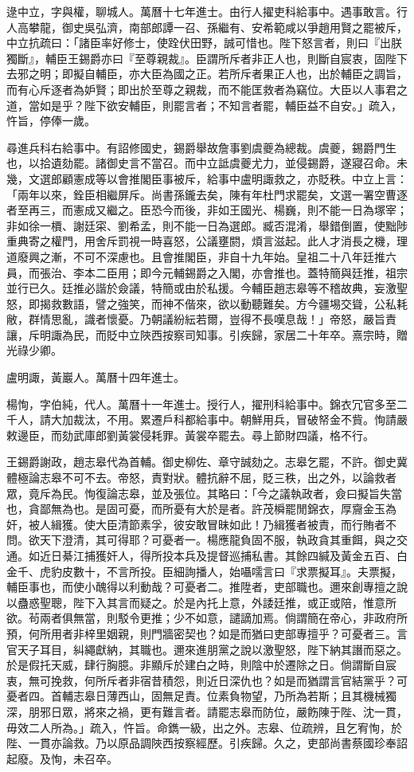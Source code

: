 \begin{pinyinscope}
逯中立，字與權，聊城人。萬曆十七年進士。由行人擢吏科給事中。遇事敢言。行人高攀龍，御史吳弘濟，南部郎譚一召、孫繼有、安希範咸以爭趙用賢之罷被斥，中立抗疏曰：「諸臣率好修士，使跧伏田野，誠可惜也。陛下怒言者，則曰『出朕獨斷』，輔臣王錫爵亦曰『至尊親裁』。臣謂所斥者非正人也，則斷自宸衷，固陛下去邪之明；即擬自輔臣，亦大臣為國之正。若所斥者果正人也，出於輔臣之調旨，而有心斥逐者為妒賢；即出於至尊之親裁，而不能匡救者為竊位。大臣以人事君之道，當如是乎？陛下欲安輔臣，則罷言者；不知言者罷，輔臣益不自安。」疏入，忤旨，停俸一歲。

尋進兵科右給事中。有詔修國史，錫爵舉故詹事劉虞夔為總裁。虞夔，錫爵門生也，以拾遺劾罷。諸御史言不當召。而中立詆虞夔尤力，並侵錫爵，遂寢召命。未幾，文選郎顧憲成等以會推閣臣事被斥，給事中盧明諏救之，亦貶秩。中立上言：「兩年以來，銓臣相繼屏斥。尚書孫鑨去矣，陳有年杜門求罷矣，文選一署空曹逐者至再三，而憲成又繼之。臣恐今而後，非如王國光、楊巍，則不能一日為塚宰；非如徐一檟、謝廷寀、劉希孟，則不能一日為選郎。臧否混淆，舉錯倒置，使黜陟重典寄之權門，用舍斥罰視一時喜怒，公議壅閼，煩言滋起。此人才消長之機，理道廢興之漸，不可不深慮也。且會推閣臣，非自十九年始。皇祖二十八年廷推六員，而張治、李本二臣用；即今元輔錫爵之入閣，亦會推也。蓋特簡與廷推，祖宗並行已久。廷推必諧於僉議，特簡或由於私援。今輔臣趙志皋等不稽故典，妄激聖怒，即揭救數語，譬之強笑，而神不偕來，欲以動聽難矣。方今疆埸交聳，公私耗敝，群情思亂，識者懷憂。乃朝議紛紜若爾，豈得不長嘆息哉！」帝怒，嚴旨責讓，斥明諏為民，而貶中立陜西按察司知事。引疾歸，家居二十年卒。熹宗時，贈光祿少卿。

盧明諏，黃巖人。萬曆十四年進士。

楊恂，字伯純，代人。萬曆十一年進士。授行人，擢刑科給事中。錦衣冗官多至二千人，請大加裁汰，不用。累遷戶科都給事中。朝鮮用兵，冒破帑金不貲。恂請嚴敕邊臣，而劾武庫郎劉黃裳侵耗罪。黃裳卒罷去。尋上節財四議，格不行。

王錫爵謝政，趙志皋代為首輔。御史柳佐、章守誠劾之。志皋乞罷，不許。御史冀體極論志皋不可不去。帝怒，責對狀。體抗辭不屈，貶三秩，出之外，以論救者眾，竟斥為民。恂復論志皋，並及張位。其略曰：「今之議執政者，僉曰擬旨失當也，貪鄙無為也。是固可憂，而所憂有大於是者。許茂橓罷閒錦衣，厚齎金玉為奸，被人緝獲。使大臣清節素孚，彼安敢冒昧如此！乃緝獲者被責，而行賄者不問。欲天下澄清，其可得耶？可憂者一。楊應龍負固不服，執政貪其重餌，與之交通。如近日綦江捕獲奸人，得所投本兵及提督巡捕私書。其餘四緘及黃金五百、白金千、虎豹皮數十，不言所投。臣細詢播人，始囁嚅言曰『求票擬耳』。夫票擬，輔臣事也，而使小醜得以利動哉？可憂者二。推陞者，吏部職也。邇來創專擅之說以蠱惑聖聰，陛下入其言而疑之。於是內托上意，外諉廷推，或正或陪，惟意所欲。茍兩者俱無當，則駁令更推；少不如意，譴謫加焉。倘謂簡在帝心，非政府所預，何所用者非梓里姻親，則門牆密契也？如是而猶曰吏部專擅乎？可憂者三。言官天子耳目，糾繩獻納，其職也。邇來進朋黨之說以激聖怒，陛下納其譖而惡之。於是假托天威，肆行胸臆。非顯斥於建白之時，則陰中於遷除之日。倘謂斷自宸衷，無可挽救，何所斥者非宿昔積怨，則近日深仇也？如是而猶謂言官結黨乎？可憂者四。首輔志皋日薄西山，固無足責。位素負物望，乃所為若斯；且其機械獨深，朋邪日眾，將來之禍，更有難言者。請罷志皋而防位，嚴飭陳于陛、沈一貫，毋效二人所為。」疏入，忤旨。命鐫一級，出之外。志皋、位疏辨，且乞宥恂，於陛、一貫亦論救。乃以原品調陜西按察經歷。引疾歸。久之，吏部尚書蔡國珍奉詔起廢。及恂，未召卒。


\end{pinyinscope}
